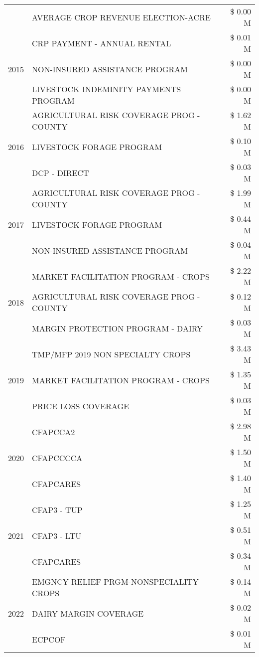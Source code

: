 \begin{tabular}{llr}
 & AVERAGE CROP REVENUE ELECTION-ACRE & \$ 0.00 M \\
\cline{1-3}
\multirow[t]{3}{*}{2015} & CRP PAYMENT - ANNUAL RENTAL & \$ 0.01 M \\
 & NON-INSURED ASSISTANCE PROGRAM & \$ 0.00 M \\
 & LIVESTOCK INDEMINITY PAYMENTS PROGRAM & \$ 0.00 M \\
\cline{1-3}
\multirow[t]{3}{*}{2016} & AGRICULTURAL RISK COVERAGE PROG - COUNTY & \$ 1.62 M \\
 & LIVESTOCK FORAGE PROGRAM & \$ 0.10 M \\
 & DCP - DIRECT & \$ 0.03 M \\
\cline{1-3}
\multirow[t]{3}{*}{2017} & AGRICULTURAL RISK COVERAGE PROG - COUNTY & \$ 1.99 M \\
 & LIVESTOCK FORAGE PROGRAM & \$ 0.44 M \\
 & NON-INSURED ASSISTANCE PROGRAM & \$ 0.04 M \\
\cline{1-3}
\multirow[t]{3}{*}{2018} & MARKET FACILITATION PROGRAM - CROPS & \$ 2.22 M \\
 & AGRICULTURAL RISK COVERAGE PROG - COUNTY & \$ 0.12 M \\
 & MARGIN PROTECTION PROGRAM - DAIRY & \$ 0.03 M \\
\cline{1-3}
\multirow[t]{3}{*}{2019} & TMP/MFP 2019 NON SPECIALTY CROPS & \$ 3.43 M \\
 & MARKET FACILITATION PROGRAM - CROPS & \$ 1.35 M \\
 & PRICE LOSS COVERAGE & \$ 0.03 M \\
\cline{1-3}
\multirow[t]{3}{*}{2020} & CFAPCCA2 & \$ 2.98 M \\
 & CFAPCCCCA & \$ 1.50 M \\
 & CFAPCARES & \$ 1.40 M \\
\cline{1-3}
\multirow[t]{3}{*}{2021} & CFAP3 - TUP & \$ 1.25 M \\
 & CFAP3 - LTU & \$ 0.51 M \\
 & CFAPCARES & \$ 0.34 M \\
\cline{1-3}
\multirow[t]{3}{*}{2022} & EMGNCY RELIEF PRGM-NONSPECIALITY CROPS & \$ 0.14 M \\
 & DAIRY MARGIN COVERAGE & \$ 0.02 M \\
 & ECPCOF & \$ 0.01 M \\
\cline{1-3}
\bottomrule
\end{tabular}
